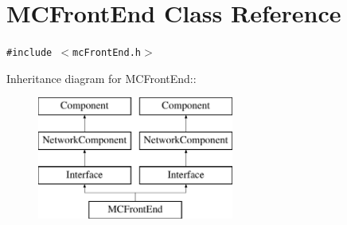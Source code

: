 \hypertarget{classMCFrontEnd}{
\section{MCFrontEnd Class Reference}
\label{classMCFrontEnd}
}
{\tt \#include $<$mcFrontEnd.h$>$}

Inheritance diagram for MCFrontEnd::\begin{figure}[H]
\begin{center}
\leavevmode
\includegraphics[height=4cm]{classMCFrontEnd}
\end{center}
\end{figure}
